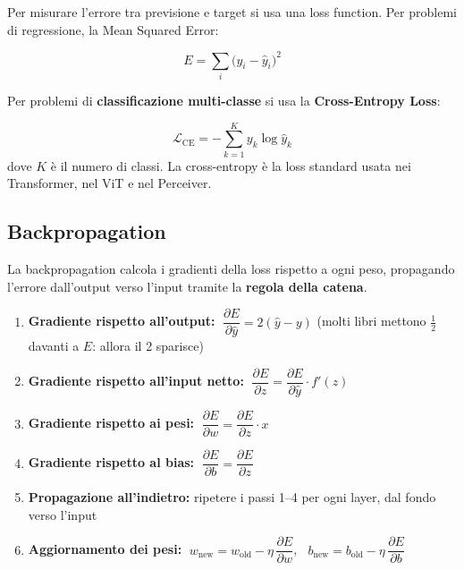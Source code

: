 \documentclass[
  11pt,
]{article}
\begin{document}
Per misurare l'errore tra previsione e target si usa una loss function. Per problemi di regressione, la Mean Squared Error:

\begin{formulabox}[title={\textbf{Mean Squared Error}}]
\[
E = \sum_{i}\bigl(y_i - \hat{y}_i\bigr)^{2}
\]
\end{formulabox}

Per problemi di \textbf{classificazione multi-classe} si usa la \textbf{Cross-Entropy Loss}:

\[
\mathcal{L}_{\text{CE}} = -\sum_{k=1}^{K} y_k \log \hat{y}_k
\]
dove $K$ è il numero di classi. La cross-entropy è la loss standard usata nei Transformer, nel ViT e nel Perceiver.

\subsection{Backpropagation}
\label{app:backprop}

La backpropagation calcola i gradienti della loss rispetto a ogni peso, propagando l'errore dall'output verso l'input tramite la \textbf{regola della catena}.

\begin{formulabox}[title={\textbf{I 6 passi della Backpropagation}}]
\begin{enumerate}
\item \textbf{Gradiente rispetto all'output:} $\;\dfrac{\partial E}{\partial \hat{y}} = 2(\hat{y} - y)$ (molti libri mettono $\tfrac{1}{2}$ davanti a $E$: allora il 2 sparisce)
\item \textbf{Gradiente rispetto all'input netto:} $\;\dfrac{\partial E}{\partial z} = \dfrac{\partial E}{\partial \hat{y}} \cdot f'(z)$
\item \textbf{Gradiente rispetto ai pesi:} $\;\dfrac{\partial E}{\partial w} = \dfrac{\partial E}{\partial z} \cdot x$
\item \textbf{Gradiente rispetto al bias:} $\;\dfrac{\partial E}{\partial b} = \dfrac{\partial E}{\partial z}$
\item \textbf{Propagazione all'indietro:} ripetere i passi 1--4 per ogni layer, dal fondo verso l'input
\item \textbf{Aggiornamento dei pesi:} $\;w_{\text{new}} = w_{\text{old}} - \eta \,\dfrac{\partial E}{\partial w}$, $\;\;b_{\text{new}} = b_{\text{old}} - \eta \,\dfrac{\partial E}{\partial b}$
\end{enumerate}
\end{formulabox}
\end{document}
